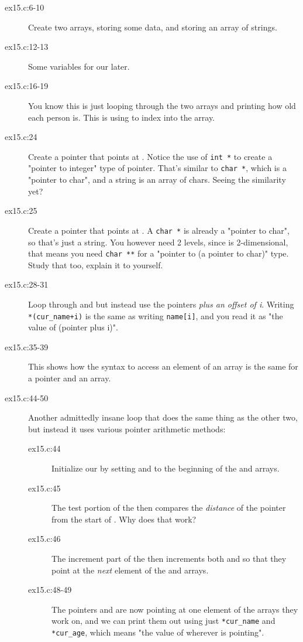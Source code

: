 \begin{description}
\item[ex15.c:6-10] Create two arrays,  storing some 
    data, and  storing an array of strings.
\item[ex15.c:12-13] Some variables for our  later.
\item[ex15.c:16-19] You know this is just looping through the two arrays and
    printing how old each person is.  This is using  to 
    index into the array.
\item[ex15.c:24] Create a pointer that points at .
    Notice the use of \verb|int *| to create a
    "pointer to integer" type of pointer.  That's similar to 
    \verb|char *|, which is a "pointer to char", and a string
    is an array of chars.  Seeing the similarity yet?
\item[ex15.c:25] Create a pointer that points at .
    A \verb|char *| is already a "pointer to char", so that's 
    just a string.  You however need 2 levels, since 
    is 2-dimensional, that means you need \verb|char **| for
    a "pointer to (a pointer to char)" type. Study that too, explain
    it to yourself.
\item[ex15.c:28-31] Loop through  and  but instead
    use the pointers \emph{plus an offset of i}.  Writing
    \verb|*(cur_name+i)| is the same as writing \verb|name[i]|, and
    you read it as "the value of (pointer  plus i)".
\item[ex15.c:35-39] This shows how the syntax to access an element of an array 
    is the same for a pointer and an array.
\item[ex15.c:44-50] Another admittedly insane loop that does the same thing
    as the other two, but instead it uses various pointer arithmetic
    methods:
    \begin{description}
    \item[ex15.c:44] Initialize our  by setting 
        and  to the beginning of the  and
         arrays.
    \item[ex15.c:45] The test portion of the  then compares
        the \emph{distance} of the pointer  from the
        start of .  Why does that work?
    \item[ex15.c:46] The increment part of the  then increments
        both  and  so that they point
        at the \emph{next} element of the  and 
        arrays.
    \item[ex15.c:48-49] The pointers  and  
        are now pointing at one element of the arrays they work on,
        and we can print them out using just \verb|*cur_name| and
        \verb|*cur_age|, which means "the value of wherever 
            is pointing".
    \end{description}
\end{description}


